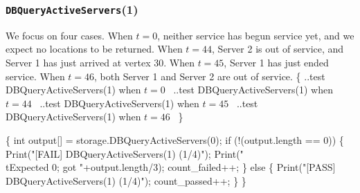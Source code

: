 \documentclass{article}
\def\nwendcode{\endtrivlist \endgroup}
\let\nwdocspar=\par
\begin{document}
\subsubsection{{\tt{}DBQueryActiveServers}(1)}
We focus on four cases. When $t=0$, neither service has begun service yet,
and we expect no locations to be returned. When $t=44$, Server 2 is out of
service, and Server 1 has just arrived at vertex 30. When $t=45$, Server 1
has just ended service. When $t=46$, both Server 1 and Server 2 are out of
service.
\nwenddocs{}\endmoddef{}
\{
  \LA{}..test \code{}DBQueryActiveServers\edoc{}(1) when $t=0$~{\nwtagstyle{}}\RA{}
  \LA{}..test \code{}DBQueryActiveServers\edoc{}(1) when $t=44$~{\nwtagstyle{}}\RA{}
  \LA{}..test \code{}DBQueryActiveServers\edoc{}(1) when $t=45$~{\nwtagstyle{}}\RA{}
  \LA{}..test \code{}DBQueryActiveServers\edoc{}(1) when $t=46$~{\nwtagstyle{}}\RA{}
\}
\nwendcode{}\nwdocspar
\nwenddocs{}\endmoddef{}
\{
  int output[] = storage.DBQueryActiveServers(0);
  if (!(output.length == 0)) \{
    Print("[FAIL] DBQueryActiveServers(1) (1/4)");
    Print("\\tExpected 0; got "+output.length/3);
    count_failed++;
  \} else \{
    Print("[PASS] DBQueryActiveServers(1) (1/4)");
    count_passed++;
  \}
\}
\nwendcode{}\nwdocspar
\nwenddocs{}\endmoddef{}
\end{document}
